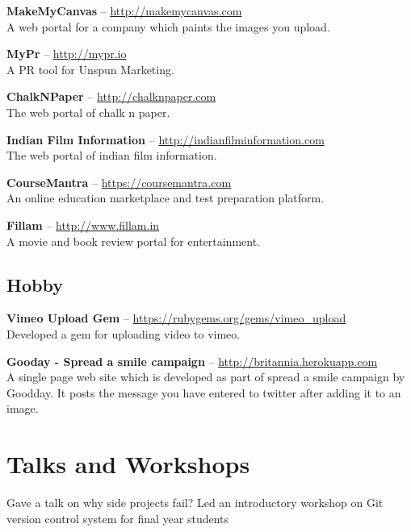 \documentclass[11pt,a4paper]{moderncv}
\begin{document}
\cvlistitem
{\textbf{MakeMyCanvas} -- {\small \href{http://makemycanvas.com}{http://makemycanvas.com}}
  \\A web portal for a company which paints the images you upload.
}

\cvlistitem
{\textbf{MyPr} -- {\small \href{http://mypr.io}{http://mypr.io}}
  \\A PR tool for Unspun Marketing.
}

\cvlistitem
{\textbf{ChalkNPaper} -- {\small \href{http://chalknpaper.com}{http://chalknpaper.com}}
  \\The web portal of chalk n paper.
}

\cvlistitem
{\textbf{Indian Film Information} -- {\small \href{http://indianfilminformation.com}{http://indianfilminformation.com}}
  \\The web portal of indian film information.
}

\cvlistitem
{\textbf{CourseMantra} -- {\small \href{https://coursemantra.com}{https://coursemantra.com}}
  \\An online education marketplace and test preparation platform.
}

\cvlistitem
{\textbf{Fillam} -- {\small \href{http://www.fillam.in}{http://www.fillam.in}}
  \\A movie and book review portal for entertainment.
}


\subsection{Hobby}

\cvlistitem
{\textbf{Vimeo Upload Gem} -- {\small \href{https://rubygems.org/gems/vimeo\_upload}{https://rubygems.org/gems/vimeo\_upload}}
  \\Developed a gem for uploading video to vimeo.
}

\cvlistitem
{\textbf{Gooday - Spread a smile campaign} -- {\small \href{http://britannia.herokuapp.com}{http://britannia.herokuapp.com}}
  \\A single page web site which is developed as part of spread a smile campaign by\\
  Goodday. It posts the message you have entered to twitter after adding it to an\\
  image.
}



\section{Talks and Workshops}
{Gave a talk on why side projects fail?}
{Led an introductory workshop on Git version control system for final year students} 
\end{document}
